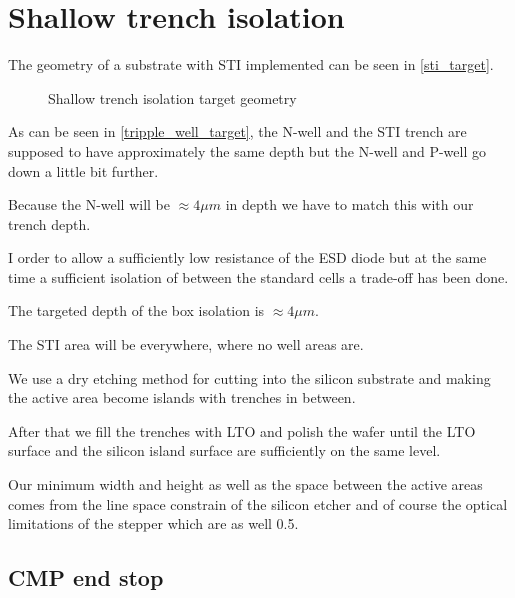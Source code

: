 \section{Shallow trench isolation}\label{sti_chapter}
The geometry of a substrate with STI implemented can be seen in \autoref{sti_target}.

\begin{figure}[H]
	\centering
	\begin{tikzpicture}[node distance = 3cm, auto, thick,scale=\CrossAndTopSectionBig, every node/.style={transform shape}]
		
	\end{tikzpicture}
	\begin{tikzpicture}[node distance = 3cm, auto, thick,scale=\CrossAndTopSectionBig, every node/.style={transform shape}]
		
	\end{tikzpicture}
	\caption{Shallow trench isolation target geometry}
	\label{sti_target}
\end{figure}

As can be seen in \autoref{tripple_well_target}, the N-well and the STI trench are supposed to have approximately the same depth but the N-well and P-well go down a little bit further.

Because the N-well will be $\approx 4 \mu m$ in depth we have to match this with our trench depth.

I order to allow a sufficiently low resistance of the ESD diode but at the same time a sufficient isolation of between the standard cells a trade-off has been done.

The targeted depth of the box isolation is $\approx 4 \mu m$.

The STI area will be everywhere, where no well areas are.

We use a dry etching method for cutting into the silicon substrate and making the active area become islands with trenches in between.

After that we fill the trenches with LTO and polish the wafer until the LTO surface and the silicon island surface are sufficiently on the same level.

Our minimum width and height as well as the space between the active areas comes from the line space constrain of the silicon etcher and of course the optical limitations of the stepper which are as well 0.5\um.

\newpage

\subsection{CMP end stop}\label{sti_end_stop}

